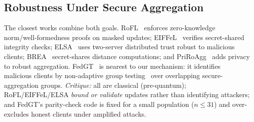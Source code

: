 \documentclass[conference]{IEEEtran}
\begin{document}
\subsection{Robustness Under Secure Aggregation}
The closest works combine both goals. RoFL~\cite{rofl} enforces zero-knowledge
norm/well-formedness proofs on masked updates; EIFFeL~\cite{eiffel} verifies
secret-shared integrity checks; ELSA~\cite{elsa} uses two-server distributed trust
robust to malicious clients; BREA~\cite{brea2021} secret-shares distance
computations; and PriRoAgg~\cite{priroagg2024} adds privacy to robust aggregation.
FedGT~\cite{fedgt} is nearest to our mechanism: it identifies malicious clients by
non-adaptive group testing~\cite{dorfman1943,aldridge2019} over overlapping
secure-aggregation groups. \emph{Critique:} all are classical (pre-quantum);
RoFL/EIFFeL/ELSA \emph{bound or validate} updates rather than identifying attackers;
and FedGT's parity-check code is fixed for a small population ($n\!\le\!31$) and
over-excludes honest clients under amplified attacks.
\end{document}
